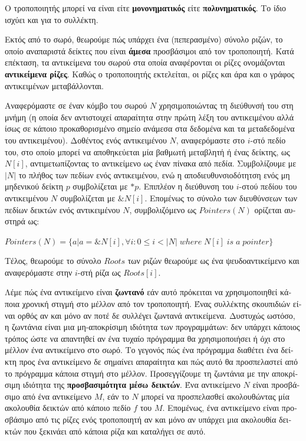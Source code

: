 \begin{greek}
Ο τροποποιητής μπορεί να είναι είτε \textbf{μονονηματικός}
είτε \textbf{πολυνηματικός}. Το ίδιο ισχύει και για το συλλέκτη.

Εκτός από το σωρό, θεωρούμε πώς υπάρχει ένα (πεπερασμένο) σύνολο
ριζών, το οποίο αναπαριστά δείκτες που είναι \textbf{άμεσα}
προσβάσιμοι από τον τροποποιητή. Κατά επέκταση, τα αντικείμενα
του σωρού στα οποία αναφέρονται οι ρίζες ονομάζονται
\textbf{αντικείμενα ρίζες}. Καθώς ο τροποποιητής εκτελείται,
οι ρίζες και άρα και ο γράφος αντικειμένων μεταβάλλονται.

Αναφερόμαστε σε έναν κόμβο του σωρού $N$ χρησιμοποιώντας τη
διεύθυνσή του στη μνήμη (η οποία δεν αντιστοιχεί απαραίτητα
στην πρώτη λέξη του αντικειμένου αλλά ίσως σε κάποιο προκαθορισμένο
σημείο ανάμεσα στα δεδομένα και τα μεταδεδομένα του αντικειμένου).
Δοθέντος ενός αντικειμένου $N$, αναφερόμαστε στο $i$-στό πεδίο
του, στο οποίο μπορεί να αποθηκεύεται μία βαθμωτή μεταβλητή ή
ένας δείκτης, ως $N[i]$, αντιμετωπίζοντας το αντικείμενο ως
έναν πίνακα από πεδία. Συμβολίζουμε με $|N|$ το πλήθος των
πεδίων ενός αντικειμένου, ενώ η αποδιευθυνσιοδότητση ενός
μη μηδενικού δείκτη $p$ συμβολίζεται με $*p$. Επιπλέον η διεύθυνση
του $i$-στού πεδίου του αντικειμένου $N$ συμβολίζεται με
$\&N[i]$. Επομένως το σύνολο των διευθύνσεων των πεδίων δεικτών
ενός αντικειμένου $N$, συμβολιζόμενο ως $Pointers(N)$ ορίζεται
αυστηρά ως:

$Pointers(N)=\{a | a=\&N[i], \forall i: 0 \leq i < |N| \; where \; N[i] \; is \; a \; pointer\}$

Τέλος, θεωρούμε το σύνολο $Roots$ των ριζών θεωρούμε ως ένα
ψευδοαντικείμενο και αναφερόμαστε στην $i$-στή ρίζα ως $Roots[i]$.

Λέμε πώς ένα αντικείμενο είναι \textbf{ζωντανό} εάν αυτό πρόκειται
να χρησιμοποιηθεί κάποια χρονική στιγμή στο μέλλον από τον τροποποιητή.
Ένας συλλέκτης σκουπιδιών είναι ορθός αν και μόνο αν ποτέ δε
συλλέγει ζωντανά αντικείμενα. Δυστυχώς ωστόσο, η ζωντάνια είναι
μια μη-αποκρίσιμη ιδιότητα των προγραμμάτων: δεν υπάρχει κάποιος
τρόπος ώστε να απαντηθεί αν ένα τυχαίο πρόγραμμα θα χρησιμοποιήσει
ή όχι στο μέλλον ένα αντικείμενο στο σωρό. Το γεγονός πώς ένα
πρόγραμμα διαθέτει ένα δείκτη προς ένα αντικείμενο δε σημαίνει
απαραίτητα και πώς αυτό θα προσπελαστεί από το πρόγραμμα κάποια
στιγμή στο μέλλον. Προσεγγίζουμε τη ζωντάνια με την αποκρίσιμη
ιδιότητα της \textbf{προσβασιμότητα μέσω δεικτών}. Ένα αντικείμενο
$N$ είναι προσβάσιμο από ένα αντικείμενο $M$, εάν το $N$ μπορεί
να προσπελασθεί ακολουθώντας μία ακολουθία δεικτών από κάποιο
πεδίο $f$ του $M$. Επομένως, ένα αντικείμενο είναι προσβάσιμο
από τις ρίζες ενός τροποποιητή αν και μόνο αν υπάρχει μια ακολουθία
δεικτών που ξεκινάει από κάποια ρίζα και καταλήγει σε αυτό.


\end{greek}
